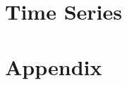 \documentclass[a4paper]{report}
\begin{document}
\chapter{Time Series}

% 
% 
% 
% 
% 
% 

\chapter*{Appendix}

\nocite{*} %


\end{document}
